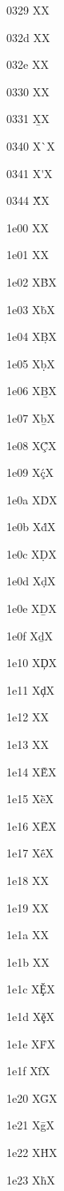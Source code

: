 \documentclass[11pt]{article}
\begin{document}
0329 X{\textsyllabic{}}X

032d X{\textsubcircum{}}X

032e X{\textsubbreve{}}X

0330 X{\textsubtilde{}}X

0331 X{\b{}}X

0340 X{\`{}}X

0341 X{\'{}}X

0344 X{\'{\"{}}}X

1e00 X{}X

1e01 X{}X

1e02 X{\.B}X

1e03 X{\.b}X

1e04 X{\d{B}}X

1e05 X{\d{b}}X

1e06 X{\b{B}}X

1e07 X{\b{b}}X

1e08 X{\'{\c{C}}}X

1e09 X{\'{\c{c}}}X

1e0a X{\.D}X

1e0b X{\.d}X

1e0c X{\d{D}}X

1e0d X{\d{d}}X

1e0e X{\b{D}}X

1e0f X{\b{d}}X

1e10 X{\c{D}}X

1e11 X{\c{d}}X

1e12 X{}X

1e13 X{}X

1e14 X{\`{\={E}}}X

1e15 X{\`{\={e}}}X

1e16 X{\'{\={E}}}X

1e17 X{\'{\={e}}}X

1e18 X{}X

1e19 X{}X

1e1a X{}X

1e1b X{}X

1e1c X{\u{\c{E}}}X

1e1d X{\u{\c{e}}}X

1e1e X{\.F}X

1e1f X{\.f}X

1e20 X{\=G}X

1e21 X{\=g}X

1e22 X{\.H}X

1e23 X{\.h}X
\end{document}
